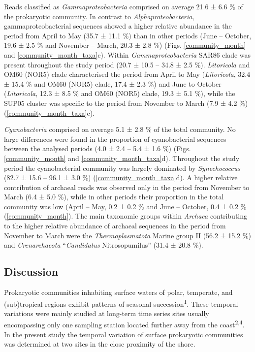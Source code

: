 \documentclass[
  12pt,
]{article}
\begin{document}
Reads classified as \emph{Gammaproteobacteria} comprised on average 21.6
± 6.6 \si{\percent} of the prokaryotic community. In contrast to
\emph{Alphaproteobacteria}, gammaproteobacterial sequences showed a
higher relative abundance in the period from April to May (35.7 ± 11.1
\si{\percent}) than in other periods (June -- October, 19.6 ± 2.5
\si{\percent} and November -- March, 20.3 ± 2.8 \si{\percent}) (Figs.
\ref{community_month} and \ref{community_month_taxa}c). Within
\emph{Gammaproteobacteria} SAR86 clade was present throughout the study
period (20.7 ± 10.5 -- 34.8 ± 2.5 \si{\percent}). \emph{Litoricola} and
OM60 (NOR5) clade characterised the period from April to May
(\emph{Litoricola}, 32.4 ± 15.4 \si{\percent} and OM60 (NOR5) clade,
17.4 ± 2.3 \si{\percent}) and June to October (\emph{Litoricola}, 12.3 ±
8.5 \si{\percent} and OM60 (NOR5) clade, 19.3 ± 5.1 \si{\percent}),
while the SUP05 cluster was specific to the period from November to
March (7.9 ± 4.2 \si{\percent}) (\autoref{community_month_taxa}c).

\emph{Cyanobacteria} comprised on average 5.1 ± 2.8 \si{\percent} of the
total community. No large differences were found in the proportion of
cyanobacterial sequences between the analysed periods (4.0 ± 2.4 -- 5.4
± 1.6 \si{\percent}) (Figs. \ref{community_month} and
\ref{community_month_taxa}d). Throughout the study period the
cyanobacterial community was largely dominated by \emph{Synechococcus}
(82.7 ± 15.6 -- 96.1 ± 3.0 \si{\percent})
(\autoref{community_month_taxa}d). A higher relative contribution of
archaeal reads was observed only in the period from November to March
(6.4 ± 5.0 \si{\percent}), while in other periods their proportion in
the total community was low (April -- May, 0.2 ± 0.2 \si{\percent} and
June -- October, 0.4 ± 0.2 \si{\percent} (\autoref{community_month}).
The main taxonomic groups within \emph{Archaea} contributing to the
higher relative abundance of archaeal sequences in the period from
November to March were the \emph{Thermoplasmatota} Marine group II (56.2
± 15.2 \si{\percent}) and \emph{Crenarchaeota} ``\emph{Candidatus}
Nitrosopumilus'' (31.4 ± 20.8 \si{\percent}).

\newpage

\hypertarget{discussion}{%
\subsection{Discussion}\label{discussion}}

Prokaryotic communities inhabiting surface waters of polar, temperate,
and (sub)tropical regions exhibit patterns of seasonal
succession\textsuperscript{1}. These temporal variations were mainly
studied at long-term time series sites usually encompassing only one
sampling station located further away from the
coast\textsuperscript{2,4}. In the present study the temporal variation
of surface prokaryotic communities was determined at two sites in the
close proximity of the shore.
\end{document}

